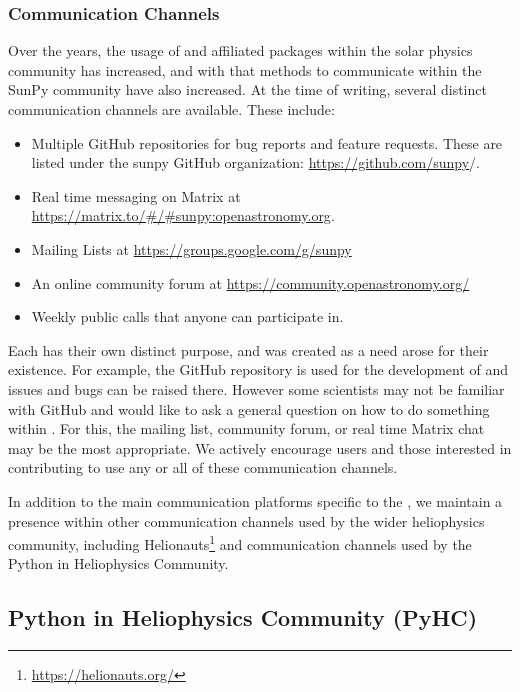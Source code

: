 \subsubsection{Communication Channels}
\label{sssec:communication-channels}

Over the years, the usage of \sunpypkg and affiliated packages within the solar physics community has increased, and with that methods to communicate within the SunPy community have also increased.
At the time of writing, several distinct communication channels are available.
These include:

\begin{itemize}
    \item Multiple GitHub repositories for bug reports and feature requests. These are listed under the sunpy GitHub organization: \url{https://github.com/sunpy}/.
    \item Real time messaging on Matrix at \url{https://matrix.to/#/#sunpy:openastronomy.org}.
    \item Mailing Lists at \url{https://groups.google.com/g/sunpy}
    \item An online community forum at \url{https://community.openastronomy.org/}
    \item Weekly public calls that anyone can participate in.
\end{itemize}

Each has their own distinct purpose, and was created as a need arose for their existence.
For example, the GitHub repository is used for the development of \sunpypkg and issues and bugs can be raised there.
However some scientists may not be familiar with GitHub and would like to ask a general question on how to do something within \sunpypkg.
For this, the mailing list, community forum, or real time Matrix chat may be the most appropriate.
We actively encourage users and those interested in contributing to use any or all of these communication channels.

In addition to the main communication platforms specific to the \sunpyproj, we maintain a presence within other communication channels used by the wider heliophysics community, including Helionauts\footnote{\url{https://helionauts.org/}} and communication channels used by the Python in Heliophysics Community.

\subsection{Python in Heliophysics Community (PyHC)}
\label{ssec:python-in-heliophysics-community-pyhc}

